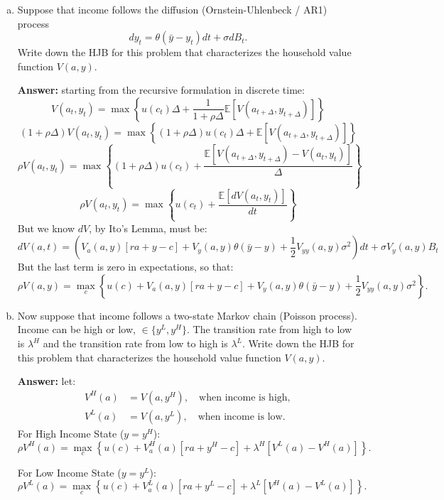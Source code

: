 \documentclass[11pt]{extarticle}
\theoremstyle{plain}
\theoremstyle{definition}
\begin{document}
\vspace{4mm}
\begin{enumerate}[(a)]
\item Suppose that income follows the diffusion (Ornstein-Uhlenbeck / AR1) process
\begin{equation*}
	dy_t = \theta(\bar y - y_t) dt + \sigma dB_t.
\end{equation*}
Write down the HJB for this problem that characterizes the household value function $V(a, y)$. 

\textbf{Answer:} starting from the recursive formulation in discrete time: 
$$
V(a_t, y_t) = \max \left\{ u(c_t) \Delta + \frac{1}{1 + \rho \Delta} \mathbb{E}\left[ V(a_{t+\Delta}, y_{t+\Delta})\right] \right\}
$$
$$
(1 + \rho \Delta) V(a_t, y_t) = \max \left\{ (1 + \rho \Delta) u(c_t) \Delta + \mathbb{E}\left[ V(a_{t+\Delta}, y_{t+\Delta})\right] \right\}
$$
$$
\rho V(a_t, y_t) = \max \left\{ (1 + \rho \Delta) u(c_t) + \frac{\mathbb{E}\left[V(a_{t+\Delta}, y_{t+\Delta}) - V(a_t, y_t)\right]}{\Delta} \right\}
$$
$$
\rho V(a_t, y_t) = \max \left\{ u(c_t) +  \frac{\mathbb{E}\left[dV(a_t,y_t)\right]}{dt} \right\} 
$$
But we know $dV$, by Ito's Lemma, must be:
$$dV(a,t)=\left(V_a(a, y) \left[ r a + y - c \right] + V_y(a, y) \theta (\bar{y} - y) + \frac{1}{2} V_{yy}(a, y) \sigma^2\right)dt + \sigma V_y(a, y) B_t $$
But the last term is zero in expectations, so that:
\[
\rho V(a, y) = \max_{c} \left\{ u(c) + V_a(a, y) \left[ r a + y - c \right] + V_y(a, y) \theta (\bar{y} - y) + \frac{1}{2} V_{yy}(a, y) \sigma^2 \right\}.
\]

\item Now suppose that income follows a two-state Markov chain (Poisson process). Income can be high or low, $\in \{y^L, y^H\}$. The transition rate from high to low is $\lambda^H$ and the transition rate from low to high is $\lambda^L$. Write down the HJB for this problem that characterizes the household value function $V(a, y)$. 

\textbf{Answer:} let:
\begin{align*}
V^H(a) &= V(a, y^H), \quad \text{when income is high}, \\
V^L(a) &= V(a, y^L), \quad \text{when income is low}.
\end{align*}
For High Income State (\( y = y^H \)):
\[
\rho V^H(a) = \max_{c} \left\{ u(c)  + V_a^H(a) \left[ r a + y^H - c \right] + \lambda^H \left[ V^L(a) - V^H(a) \right] \right\}.
\]

For Low Income State (\( y = y^L \)):
\[
 \rho V^L(a) = \max_{c} \left\{ u(c) + V_a^L(a) \left[ r a + y^L - c \right] + \lambda^L \left[ V^H(a) - V^L(a) \right] \right\}.
\]



\end{enumerate}
\end{document}
